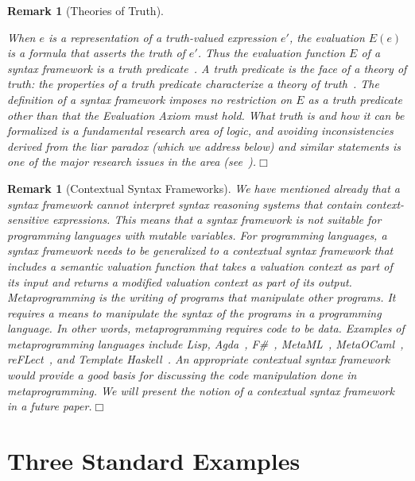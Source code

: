 \documentclass[11pt,fleqn]{article}
\newcommand{\bsp}{\begin{sloppypar}}
\newcommand{\esp}{\end{sloppypar}}
\newtheorem{rem}[thm]{Remark}
\begin{document}
\begin{rem}[Theories of Truth]\em\bsp
When $e$ is a representation of a truth-valued expression $e'$, the
evaluation $E(e)$ is a formula that asserts the truth of $e'$.  Thus
the evaluation function $E$ of a syntax framework is a \emph{truth
  predicate}~\cite{Truth13}.  A truth predicate is the face of a
\emph{theory of truth}: the properties of a truth predicate
characterize a theory of truth~\cite{Leitgeb07}.  The definition of a
syntax framework imposes no restriction on $E$ as a truth predicate
other than that the Evaluation Axiom must hold.  What truth is and how
it can be formalized is a fundamental research area of logic, and
avoiding inconsistencies derived from the liar paradox (which we
address below) and similar statements is one of the major research
issues in the area (see~\cite{Halbach11}).\hfill $\Box$\esp
\end{rem}

\begin{rem}[Contextual Syntax Frameworks]\em\label{rem:contextual}
We have mentioned already that a syntax framework cannot interpret
syntax reasoning systems that contain context-sensitive expressions.
This means that a syntax framework is not suitable for programming
languages with mutable variables.  For programming languages, a syntax
framework needs to be generalized to a \emph{contextual syntax
  framework} that includes a semantic valuation function that takes a
\emph{valuation context} as part of its input and returns a modified
valuation context as part of its output.  \emph{Metaprogramming} is
the writing of programs that manipulate other programs.  It requires a
means to manipulate the syntax of the programs in a programming
language.  In other words, metaprogramming requires code to be data.
Examples of metaprogramming languages include Lisp,
Agda~\cite{Norell07,Norell09}, F\#~\cite{FSharp11},
MetaML~\cite{TahaSheard00}, MetaOCaml~\cite{MetaOCaml11},
reFLect~\cite{GrundyEtAl06}, and Template
Haskell~\cite{SheardJones02}.  An appropriate contextual syntax
framework would provide a good basis for discussing the code
manipulation done in metaprogramming.  We will present the notion of a
contextual syntax framework in a future paper.\hfill $\Box$
\end{rem}

\section{Three Standard Examples} \label{sec:examples}
\end{document}
